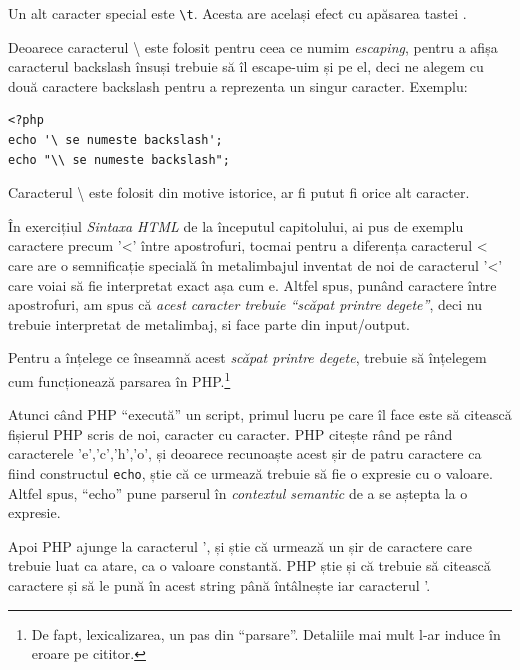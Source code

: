 Un alt caracter special este \texttt{{\textbackslash}t}.
Acesta are același efect cu apăsarea tastei .

Deoarece caracterul {\textbackslash} este folosit pentru ceea
ce numim \textsl{escaping}, pentru a afișa caracterul backslash
însuși trebuie să îl escape-uim și pe el, deci ne alegem cu
două caractere backslash pentru a reprezenta un singur caracter.
Exemplu:
\begin{lstlisting}
<?php
echo '\ se numeste backslash';
echo "\\ se numeste backslash";
\end{lstlisting}

Caracterul {\textbackslash} este folosit din motive istorice,
ar fi putut fi orice alt caracter.

În exercițiul \textit{Sintaxa HTML} de la începutul
capitolului, ai pus de exemplu caractere precum '<' între
apostrofuri, tocmai pentru a diferența caracterul < care are
o semnificație specială în metalimbajul inventat de noi de
caracterul '<' care voiai să fie interpretat exact așa cum e.
Altfel spus, punând caractere între apostrofuri, am spus
că \textit{acest caracter trebuie ``scăpat printre degete''}, deci
nu trebuie interpretat de metalimbaj, si face parte din input/output.

Pentru a înțelege ce înseamnă acest \textit{scăpat printre degete},
trebuie să înțelegem cum funcționează parsarea în PHP.\footnote{De fapt,
lexicalizarea, un pas din ``parsare''. Detaliile mai mult l-ar
induce în eroare pe cititor.}

Atunci când PHP ``execută'' un script, primul lucru pe care îl
face este să citească fișierul PHP scris de noi, caracter
cu caracter. PHP citește rând pe rând caracterele 'e','c','h','o',
și deoarece recunoaște acest șir de patru caractere ca fiind
constructul \texttt{echo}, știe că ce urmează trebuie să
fie o expresie cu o valoare. Altfel spus, ``echo'' pune
parserul în \textsl{contextul semantic} de a se aștepta la o
expresie.

Apoi PHP ajunge la caracterul ', și știe că urmează
un șir de caractere care trebuie luat ca atare, ca o valoare
constantă. PHP știe și că trebuie să citească caractere și
să le pună în acest string până întâlnește iar caracterul '.

